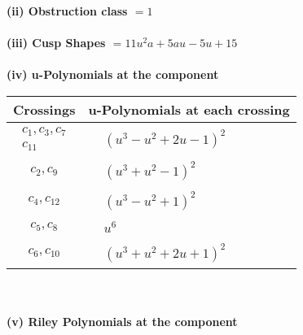\documentclass[1p]{elsarticle_modified}
\theoremstyle{definition}
\begin{document}
\flushleft \textbf{(ii) Obstruction class $= 1$}\\~\\
\flushleft \textbf{(iii) Cusp Shapes $= 11 u^2 a+5 a u-5 u+15$}\\~\\
\newpage\renewcommand{\arraystretch}{1}
\flushleft \textbf{(iv) u-Polynomials at the component}\newline \\
\begin{tabular}{m{50pt}|m{274pt}}
Crossings & \hspace{64pt}u-Polynomials at each crossing \\
\hline $$\begin{aligned}c_{1},c_{3},c_{7}\\c_{11}\end{aligned}$$&$\begin{aligned}
&(u^3- u^2+2 u-1)^2
\end{aligned}$\\
\hline $$\begin{aligned}c_{2},c_{9}\end{aligned}$$&$\begin{aligned}
&(u^3+u^2-1)^2
\end{aligned}$\\
\hline $$\begin{aligned}c_{4},c_{12}\end{aligned}$$&$\begin{aligned}
&(u^3- u^2+1)^2
\end{aligned}$\\
\hline $$\begin{aligned}c_{5},c_{8}\end{aligned}$$&$\begin{aligned}
&u^6
\end{aligned}$\\
\hline $$\begin{aligned}c_{6},c_{10}\end{aligned}$$&$\begin{aligned}
&(u^3+u^2+2 u+1)^2
\end{aligned}$\\
\hline
\end{tabular}\\~\\
\newpage\renewcommand{\arraystretch}{1}
\flushleft \textbf{(v) Riley Polynomials at the component}\newline \\
\end{document}

